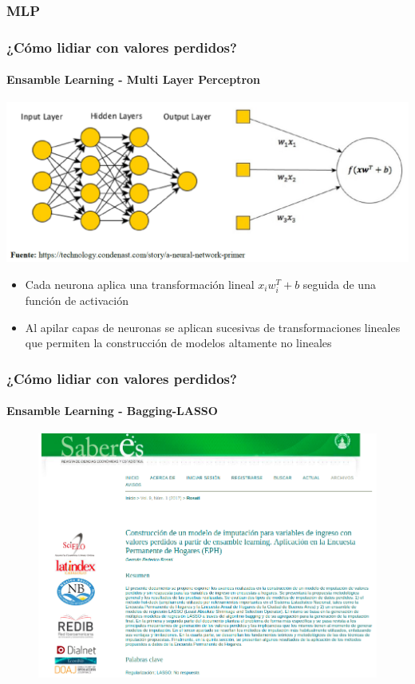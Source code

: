 \documentclass{beamer}
\begin{document}
\subsubsection{MLP}
\begin{frame}
\frametitle{¿Cómo lidiar con valores perdidos?}
\framesubtitle{Ensamble Learning - Multi Layer Perceptron}
\includegraphics[width=1\linewidth, height=0.5\textheight]{../img/mlp}
\begin{itemize}		
	\item Cada neurona aplica una transformación lineal  $x_{i}w_{i}^T+b$ seguida de una función de activación
	\item Al apilar capas de neuronas se aplican sucesivas de transformaciones lineales que permiten la construcción de modelos altamente no lineales
\end{itemize}
\end{frame}

\begin{frame}
\frametitle{¿Cómo lidiar con valores perdidos?}
\framesubtitle{Ensamble Learning  - Bagging-LASSO}
\begin{figure}
	\centering
	\includegraphics[width=0.7\linewidth]{../img/saberes}
	\label{fig:saberes}
\end{figure}
\end{frame}
\end{document}
